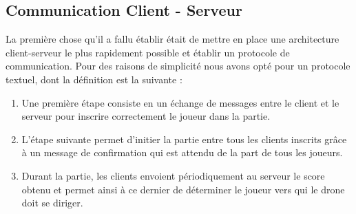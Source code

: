 \subsection{Communication Client - Serveur}

La première chose qu'il a fallu établir était de mettre en place une architecture client-serveur le plus rapidement possible et établir un protocole de communication. Pour des raisons de simplicité nous avons opté pour un protocole textuel, dont la définition est la suivante :
\begin{enumerate}
\item Une première étape consiste en un échange de messages entre le client et le serveur pour inscrire correctement le joueur dans la partie.
\item L'étape suivante permet d'initier la partie entre tous les clients inscrits grâce à un message de confirmation qui est attendu de la part de tous les joueurs.
\item Durant la partie, les clients envoient périodiquement au serveur le score obtenu et permet ainsi à ce dernier de déterminer le joueur vers qui le drone doit se diriger.
\end{enumerate}